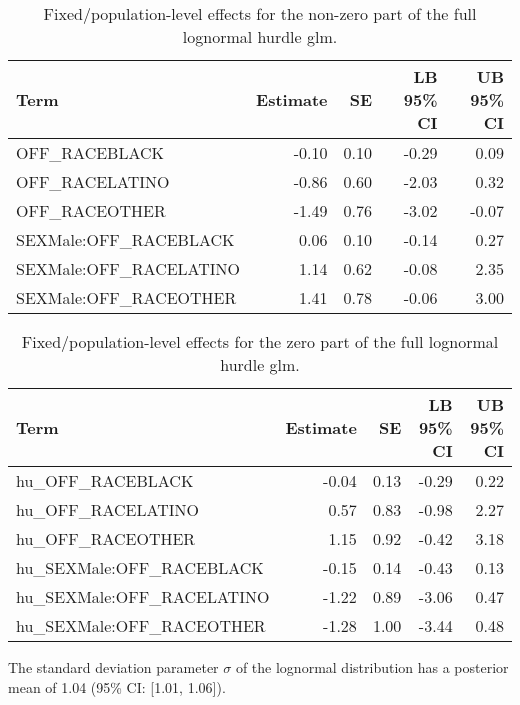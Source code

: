 \documentclass[
  letterpaper,
  DIV=11,
  numbers=noendperiod]{scrartcl}
\begin{document}
\hypertarget{tbl-brms-hurdle-model-summary-2-racesex}{}
\begin{table}
\caption{\label{tbl-brms-hurdle-model-summary-2-racesex}Fixed/population-level effects for the non-zero part of the full
lognormal hurdle glm. }\tabularnewline

\centering
\begin{tabular}{lrrrr}
\toprule
Term & Estimate & SE & LB 95\% CI & UB 95\% CI\\
\midrule
OFF\_RACEBLACK & -0.10 & 0.10 & -0.29 & 0.09\\
OFF\_RACELATINO & -0.86 & 0.60 & -2.03 & 0.32\\
OFF\_RACEOTHER & -1.49 & 0.76 & -3.02 & -0.07\\
SEXMale:OFF\_RACEBLACK & 0.06 & 0.10 & -0.14 & 0.27\\
SEXMale:OFF\_RACELATINO & 1.14 & 0.62 & -0.08 & 2.35\\
\addlinespace
SEXMale:OFF\_RACEOTHER & 1.41 & 0.78 & -0.06 & 3.00\\
\bottomrule
\end{tabular}
\end{table}

\hypertarget{tbl-brms-hurdle-model-summary-2-zero-racesex}{}
\begin{table}
\caption{\label{tbl-brms-hurdle-model-summary-2-zero-racesex}Fixed/population-level effects for the zero part of the full lognormal
hurdle glm. }\tabularnewline

\centering
\begin{tabular}{lrrrr}
\toprule
Term & Estimate & SE & LB 95\% CI & UB 95\% CI\\
\midrule
hu\_OFF\_RACEBLACK & -0.04 & 0.13 & -0.29 & 0.22\\
hu\_OFF\_RACELATINO & 0.57 & 0.83 & -0.98 & 2.27\\
hu\_OFF\_RACEOTHER & 1.15 & 0.92 & -0.42 & 3.18\\
hu\_SEXMale:OFF\_RACEBLACK & -0.15 & 0.14 & -0.43 & 0.13\\
hu\_SEXMale:OFF\_RACELATINO & -1.22 & 0.89 & -3.06 & 0.47\\
\addlinespace
hu\_SEXMale:OFF\_RACEOTHER & -1.28 & 1.00 & -3.44 & 0.48\\
\bottomrule
\end{tabular}
\end{table}

The standard deviation parameter \(\sigma\) of the lognormal
distribution has a posterior mean of 1.04 (95\% CI: {[}1.01, 1.06{]}).
\end{document}

